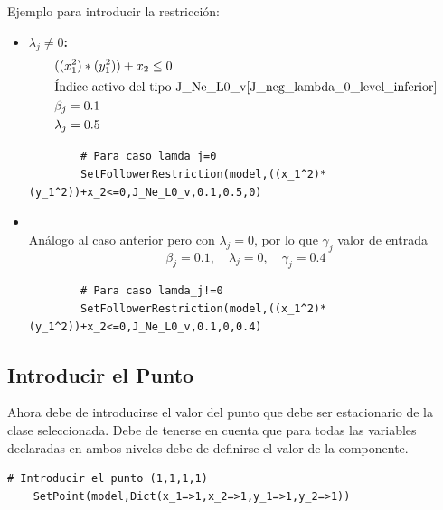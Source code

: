 \begin{itemize}
Ejemplo para introducir la restricción:

\begin{itemize}
    
    \item \textbf{$ \lambda_j \neq 0$:}\\
    \begin{align*}
        &((x_1^2)*(y_1^2))+x_2 \leq 0\\
        &\text{Índice activo del tipo J\_Ne\_L0\_v} \ref{J_neg_lambda_0_level_inferior}\\
        & \beta_j=0.1\\
        & \lambda_j=0.5 \\
    \end{align*}
    \begin{lstlisting}
        # Para caso lamda_j=0
        SetFollowerRestriction(model,((x_1^2)*(y_1^2))+x_2<=0,J_Ne_L0_v,0.1,0.5,0)
    \end{lstlisting}
    

    
   
    \item {}\\
    
    Análogo al caso anterior pero con $\lambda_j=0$, por lo que $\gamma_j$ valor de entrada
    \begin{equation*}
        \beta_j=0.1, \quad \lambda_j=0, \quad \gamma_j=0.4
    \end{equation*}
    \begin{lstlisting}
        # Para caso lamda_j!=0
        SetFollowerRestriction(model,((x_1^2)*(y_1^2))+x_2<=0,J_Ne_L0_v,0.1,0,0.4)
    \end{lstlisting}

\end{itemize}


\end{itemize}


\subsection{Introducir el Punto}
Ahora debe de introducirse el valor del punto que debe ser estacionario de la clase seleccionada.
Debe de tenerse en cuenta que para todas las variables declaradas en ambos niveles debe de definirse el valor de la componente.

\begin{lstlisting}[caption={Introducir el punto $(1,1,1,1)$}]
    # Introducir el punto (1,1,1,1)
    SetPoint(model,Dict(x_1=>1,x_2=>1,y_1=>1,y_2=>1))
\end{lstlisting}

